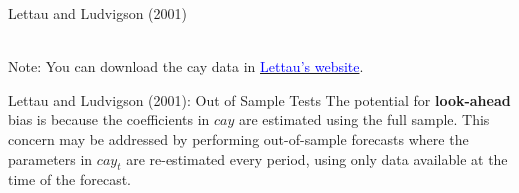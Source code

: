 \documentclass{beamer}
\begin{document}
\begin{frame}{Lettau and Ludvigson (2001)}
	\begin{table}[!htbp]
		\centering
		\caption{\textbf{Forecasting Quarterly Stock Market Excess Returns: 1952:4-1998:3} (Panel C of Table III)}
     \begin{note}
      \\ Note: You can download the cay data in \href{https://sites.google.com/view/martinlettau/data}{\textcolor{blue}{Lettau's website}}.
    \end{note}
	\end{table}	  
\end{frame}

\begin{frame}{Lettau and Ludvigson (2001): Out of Sample Tests}
	The potential for \textbf{look-ahead} bias is because the coefficients in $ cay $ are estimated using the full sample. This concern may be addressed by performing out-of-sample forecasts where the parameters in $ cay_t $ are re-estimated every period, using only data available at the time of the forecast. 
\end{frame}
\end{document}

